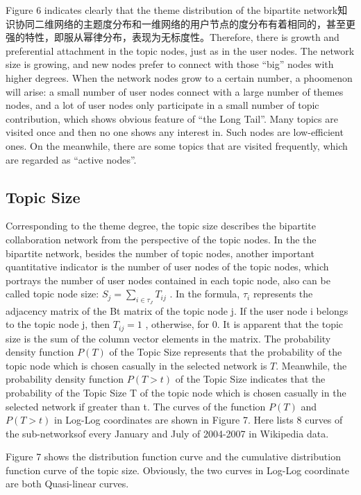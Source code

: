 \documentclass{elsarticle}
\begin{document}
Figure 6 indicates clearly that the theme distribution of the bipartite network知识协同二维网络的主题度分布和一维网络的用户节点的度分布有着相同的，甚至更强的特性，即服从幂律分布，表现为无标度性。Therefore, there is growth and preferential attachment in the topic nodes, just as in the user nodes. The network size is growing, and new nodes prefer to connect with those “big” nodes with higher degrees. When the network nodes grow to a certain number, a phoomenon will arise: a small number of user nodes connect with a large number of themes nodes, and a lot of user nodes only participate in a small number of topic contribution, which shows obvious feature of “the Long Tail”. Many topics are visited once and then no one shows any interest in. Such nodes are low-efficient ones. On the meanwhile, there are some topics that are visited frequently, which are regarded as “active nodes”. 

\subsection{Topic Size}
\label{sec:topic-size}

Corresponding to the theme degree, the topic size describes the
bipartite collaboration network from the perspective of the topic
nodes. In the the bipartite network, besides the number of topic
nodes, another important quantitative indicator is the number of user
nodes of the topic nodes, which portrays the number of user nodes
contained in each topic node, also can be called topic node size: $S_j
= \sum_{i \in \tau_{J}}T_{ij}$ . In the formula, $\tau_i$  represents
the adjacency matrix of the Bt matrix of the topic node j. If the user
node i belongs to the topic node j, then $T_{ij}=1$ , otherwise, for
0. It is apparent that the topic size is the sum of the column vector
elements in the matrix. The probability density function $P(T)$  of
the Topic Size represents that the probability of the topic node which
is chosen casually in the selected network is $T$. Meanwhile, the
probability density function $P(T>t)$  of the Topic Size indicates
that the probability of the Topic Size T of the topic node which is
chosen casually in the selected network if greater than t. The curves
of the function $P(T)$  and  $P(T>t)$  in Log-Log coordinates are
shown in Figure 7.  Here lists 8 curves of the sub-networksof every
January and July of 2004-2007 in Wikipedia data.

Figure 7 shows the distribution function curve and the cumulative
distribution function curve of the topic size. Obviously, the two
curves in Log-Log coordinate are both Quasi-linear curves. 
\end{document}
